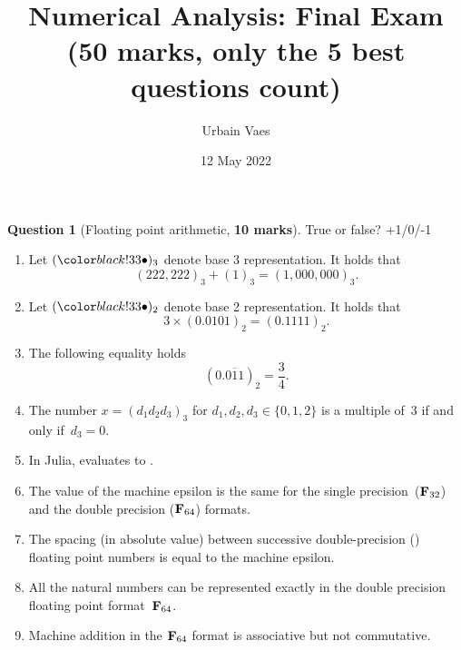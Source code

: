 \documentclass[11pt]{article}
\theoremstyle{definition}
\newtheorem{question}{Question}
\theoremstyle{remark}
\theoremstyle{plain}%
\begin{document}
\title{ \vspace{-3cm} Numerical Analysis: Final Exam \\
\small{(\textbf{50 marks}, only the 5 best questions count)}}
\author{Urbain Vaes}
\date{12 May 2022}
\maketitle

\begin{question}
    [Floating point arithmetic, \textbf{10 marks}]
    True or false? +1/0/-1
    \begin{enumerate}
        \item
            Let $(\placeholder)_3$ denote base 3 representation.
            It holds that
            \[
                (222,222)_3 + (1)_3 = (1,000,000)_3.
            \]

        \item
            Let $(\placeholder)_2$ denote base 2 representation.
            It holds that
            \[
                3 \times (0.0101)_2 = (0.1111)_2.
            \]

        \item
            The following equality holds
            \[
                (0.\overline{011})_2 = \frac{3}{4}.
            \]

        \item
            The number $x = (d_1 d_2 d_3)_3$ for $d_1, d_2, d_3 \in \{0, 1, 2\}$ is a multiple of~$3$ if and only if~$d_3 = 0$.

        \item
            In Julia,  evaluates to .

        \item
            The value of the machine epsilon is the same for the single precision~($\mathbf F_{32}$) and the double precision ($\mathbf F_{64}$) formats.

        \item
            The spacing (in absolute value) between successive double-precision () floating point numbers is equal to the machine epsilon.

        \item
            All the natural numbers can be represented exactly in the double precision floating point format~$\mathbf F_{64}$.

        \item
            Machine addition in the $\mathbf F_{64}$ format is associative but not commutative.


\end{enumerate}
\end{question}
\end{document}
